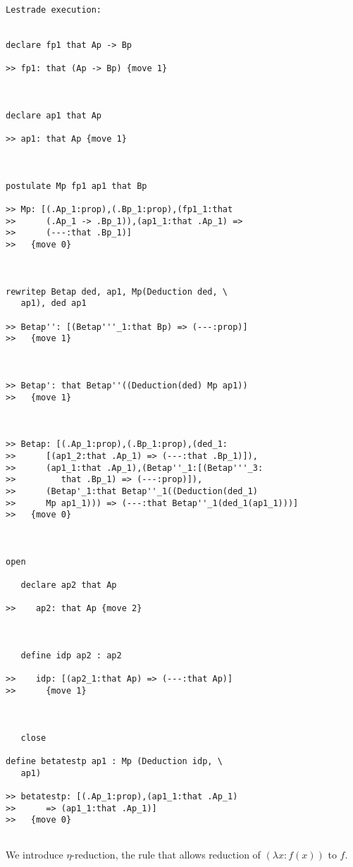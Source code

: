 \documentclass{article}
\begin{document}
\begin{verbatim}Lestrade execution:


declare fp1 that Ap -> Bp

>> fp1: that (Ap -> Bp) {move 1}



declare ap1 that Ap

>> ap1: that Ap {move 1}



postulate Mp fp1 ap1 that Bp

>> Mp: [(.Ap_1:prop),(.Bp_1:prop),(fp1_1:that
>>      (.Ap_1 -> .Bp_1)),(ap1_1:that .Ap_1) =>
>>      (---:that .Bp_1)]
>>   {move 0}



rewritep Betap ded, ap1, Mp(Deduction ded, \
   ap1), ded ap1

>> Betap'': [(Betap'''_1:that Bp) => (---:prop)]
>>   {move 1}



>> Betap': that Betap''((Deduction(ded) Mp ap1))
>>   {move 1}



>> Betap: [(.Ap_1:prop),(.Bp_1:prop),(ded_1:
>>      [(ap1_2:that .Ap_1) => (---:that .Bp_1)]),
>>      (ap1_1:that .Ap_1),(Betap''_1:[(Betap'''_3:
>>         that .Bp_1) => (---:prop)]),
>>      (Betap'_1:that Betap''_1((Deduction(ded_1)
>>      Mp ap1_1))) => (---:that Betap''_1(ded_1(ap1_1)))]
>>   {move 0}



open

   declare ap2 that Ap

>>    ap2: that Ap {move 2}



   define idp ap2 : ap2

>>    idp: [(ap2_1:that Ap) => (---:that Ap)]
>>      {move 1}



   close

define betatestp ap1 : Mp (Deduction idp, \
   ap1)

>> betatestp: [(.Ap_1:prop),(ap1_1:that .Ap_1)
>>      => (ap1_1:that .Ap_1)]
>>   {move 0}


\end{verbatim}

We introduce $\eta$-reduction, the rule that allows reduction of $(\lambda x:f(x))$ to $f$.
\end{document}
